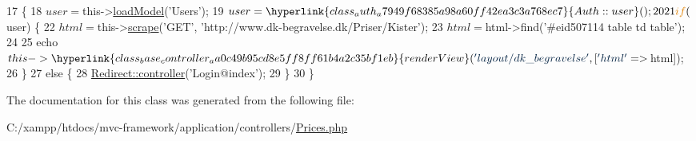 \begin{DoxyCode}
17                                    \{
18         $user = $this->\hyperlink{class_base_controller_a5fa8890bd3a9d20f5c0cc2377dc49eb1}{loadModel}(\textcolor{stringliteral}{'Users'});
19         $user = \hyperlink{class_auth_a7949f68385a98a60ff42ea3c3a768ec7}{Auth::user}();
20 
21         \textcolor{keywordflow}{if} ($user) \{
22             $html = $this->\hyperlink{class_base_controller_abd4f25604b09a96c254491df97612cc3}{scrape}(\textcolor{stringliteral}{'GET'}, \textcolor{stringliteral}{'http://www.dk-begravelse.dk/Priser/Kister'});
23             $html = $html->find(\textcolor{stringliteral}{'#eid507114 table td table'});
24 
25             echo $this->\hyperlink{class_base_controller_aa0c49b95cd8e5ff8ff61b4a2c35bf1eb}{renderView}(\textcolor{stringliteral}{'layout/dk\_begravelse'}, [\textcolor{stringliteral}{'html'} => $html]);
26         \}
27         \textcolor{keywordflow}{else} \{
28             \hyperlink{class_redirect_ab7d0d268b6aaa9a5470b7cb8c7eb1b61}{Redirect::controller}(\textcolor{stringliteral}{'Login@index'});
29         \}
30     \}
\end{DoxyCode}


The documentation for this class was generated from the following file\+:\begin{DoxyCompactItemize}
\item 
C\+:/xampp/htdocs/mvc-\/framework/application/controllers/\hyperlink{_prices_8php}{Prices.\+php}\end{DoxyCompactItemize}
